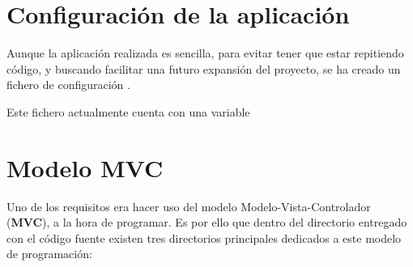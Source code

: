 \documentclass{\ClassPath/viu-tfm-template}
\begin{document}
\section{Configuración de la aplicación}
Aunque la aplicación realizada es sencilla, para evitar tener que estar repitiendo código, y buscando facilitar una futuro expansión del proyecto, se ha creado un fichero de configuración .

Este fichero actualmente cuenta con una variable 

\section{Modelo MVC}
Uno de los requisitos era hacer uso del modelo Modelo-Vista-Controlador (\textbf{MVC}), a la hora de programar. Es por ello que dentro del directorio entregado con el código fuente existen tres directorios principales dedicados a este modelo de programación:
\end{document}
